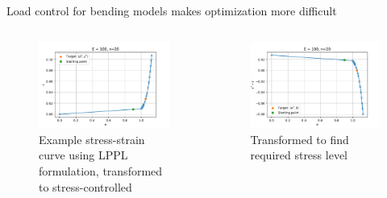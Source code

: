 \begin{frame}
Load control for bending models makes optimization more difficult
\begin{columns}[t]
\begin{column}{0.45\textwidth}
\begin{figure}[tbp]
\centering
\includegraphics[width=0.9\columnwidth]{secant-3}
\caption{\label{fig:secant-3}Example stress-strain curve using LPPL formulation, transformed to stress-controlled}
\end{figure}
\end{column}
\begin{column}{0.45\textwidth}
\begin{figure}[tbp]
\centering
\includegraphics[width=0.9\columnwidth]{secant-4}
\caption{\label{fig:secant-4}Transformed to find required stress level}
\end{figure}
\end{column}
\end{columns}
\note{
\vfill
}
\end{frame}

